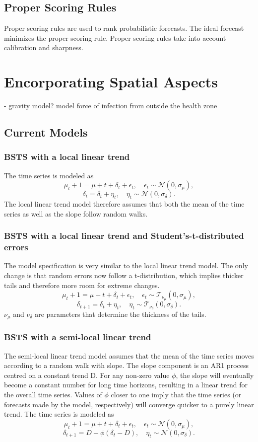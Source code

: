\section{Proper Scoring Rules}
Proper scoring rules are used to rank probabilistic forecasts. The ideal forecast minimizes the proper scoring rule. Proper scoring rules take into account calibration and sharpness. 



\chapter{Encorporating Spatial Aspects}
- gravity model? model force of infection from outside the health zone

\section{Current Models}
\subsection{BSTS with a local linear trend}

The time series is modeled as 
$$\mu_t+1 = \mu+t + \delta_t + \epsilon_t, \quad \epsilon_t \sim \mathcal{N}(0, \sigma_{\mu}), $$
$$\delta_t = \delta_t + \eta_t, \quad \eta_t \sim \mathcal{N}(0, \sigma_{\delta}). $$
The local linear trend model therefore assumes that both the mean of the time series as well as the slope follow random walks. 

\subsection{BSTS with a local linear trend and Student's-t-distributed errors}
The model specification is very similar to the local linear trend model. The only change is that random errors now follow a t-distribution, which implies thicker tails and therefore more room for extreme changes. 
$$\mu_t+1 = \mu+t + \delta_t + \epsilon_t, \quad \epsilon_t \sim \mathcal{T}_{\nu_{\mu}}(0, \sigma_{\mu}), $$
$$\delta_{t+1} = \delta_t + \eta_t, \quad \eta_t \sim \mathcal{T}_{\nu_{\delta}}(0, \sigma_{\delta}). $$
$\nu_{\mu}$ and $\nu_{\delta}$ are parameters that determine the thickness of the tails. 

\subsection{BSTS with a semi-local linear trend}
The semi-local linear trend model assumes that the mean of the time series moves according to a random walk with slope. The slope component is an AR1 process centred on a constant trend D. For any non-zero value $\phi$, the slope will eventually become a constant number for long time horizons, resulting in a linear trend for the overall time series. Values of $\phi$ closer to one imply that the time series (or forecasts made by the model, respectively) will converge quicker to a purely linear trend. 
The time series is modeled as
$$\mu_t+1 = \mu+t + \delta_t + \epsilon_t, \quad \epsilon_t \sim \mathcal{N}(0, \sigma_{\mu}), $$
$$\delta_{t+1} = D + \phi (\delta_t -D), \quad \eta_t \sim \mathcal{N}(0, \sigma_{\delta}). $$


